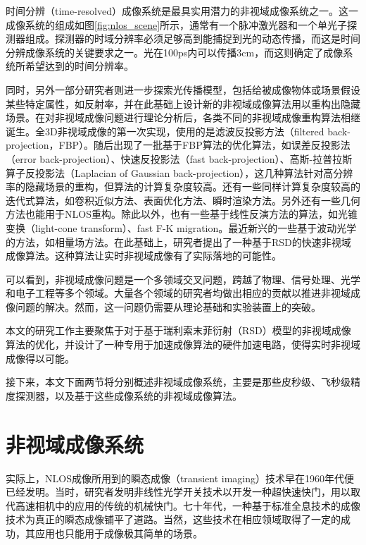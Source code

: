 \documentclass[master]{shtthesis}             %
\begin{document}
时间分辨（time-resolved）成像系统是最具实用潜力的非视域成像系统之一。这一成像系统的组成如图\ref{fig:nlos_scene}所示，通常有一个脉冲激光器和一个单光子探测器组成。探测器的时域分辨率必须足够高到能捕捉到光的动态传播，而这是时间分辨成像系统的关键要求之一\citep{faccio2018trillion}。光在100ps内可以传播3cm，而这则确定了成像系统所希望达到的时间分辨率。

同时，另外一部分研究者则进一步探索光传播模型，包括给被成像物体或场景假设某些特定属性，如反射率，并在此基础上设计新的非视域成像算法用以重构出隐藏场景。在对非视域成像问题进行理论分析后\citep{ramesh20085d}，各类不同的非视域成像重构算法相继诞生。全3D非视域成像的第一次实现，使用的是滤波反投影方法（filtered back-projection，FBP）\citep{Velten2012}。随后出现了一批基于FBP算法的优化算法，如误差反投影法（error back-projection）\citep{LaManna2019}、快速反投影法（fast back-projection）\citep{Arellano2017}、高斯-拉普拉斯算子反投影法（Laplacian of Gaussian back-projection）\citep{Laurenzis2014}，这几种算法针对高分辨率的隐藏场景的重构，但算法的计算复杂度较高。还有一些同样计算复杂度较高的迭代式算法，如卷积近似方法\citep{Ahn2019}、表面优化方法\citep{Tsai2019}、瞬时渲染方法\citep{Iseringhausen2018}。另外还有一些几何方法也能用于NLOS重构\citep{Tsai2017,Xin2019}。除此以外，也有一些基于线性反演方法的算法，如光锥变换（light-cone transform）\citep{Otoole2018}、fast F-K migration\citep{DavidB.Lindell2019}。最近新兴的一些基于波动光学的方法，如相量场方法\citep{Liu2019,Teichman2019,Dove2019,Liu2020}。在此基础上，研究者提出了一种基于RSD的快速非视域成像算法\citep{Liu}。这种算法让实时非视域成像有了实际落地的可能性。

可以看到，非视域成像问题是一个多领域交叉问题，跨越了物理、信号处理、光学和电子工程等多个领域。大量各个领域的研究者均做出相应的贡献以推进非视域成像问题的解决。然而，这一问题仍需要从理论基础和实验装置上的突破。

本文的研究工作主要聚焦于对于基于瑞利索末菲衍射（RSD）模型的非视域成像算法的优化，并设计了一种专用于加速成像算法的硬件加速电路，使得实时非视域成像得以可能。

接下来，本文下面两节将分别概述非视域成像系统，主要是那些皮秒级、飞秒级精度探测器，以及基于这些成像系统的非视域成像算法。

\section{非视域成像系统}\label{sec:img_sys}

实际上，NLOS成像所用到的瞬态成像（transient imaging）技术早在1960年代便已经发明。当时，研究者发明非线性光学开关技术以开发一种超快速快门，用以取代高速相机中的应用的传统的机械快门。七十年代，一种基于标准全息技术的成像技术为真正的瞬态成像铺平了道路\citep{faccio2018trillion,hariharan2002basics}。当然，这些技术在相应领域取得了一定的成功，其应用也只能用于成像极其简单的场景。
\end{document}
